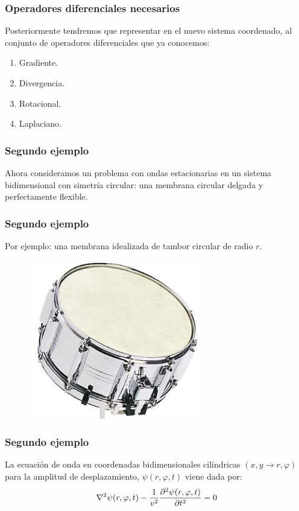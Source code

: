 \documentclass[12pt]{beamer}
\begin{document}
\begin{frame}
\frametitle{Operadores diferenciales necesarios}
Posteriormente tendremos que representar en el nuevo sistema coordenado, al conjunto de operadores diferenciales que ya conocemos:
\pause
{}
\begin{enumerate}[<+->]
\item Gradiente.
\item Divergencia.
\item Rotacional.
\item Laplaciano.
\end{enumerate}
\end{frame}
\begin{frame}
\frametitle{Segundo ejemplo}
Ahora consideramos un problema con ondas estacionarias en un sistema bidimensional con simetría circular: \pause una membrana circular delgada y perfectamente flexible.
\end{frame}
\begin{frame}
\frametitle{Segundo ejemplo}
Por ejemplo: una membrana idealizada de tambor circular de radio $r$.
\begin{figure}[H]
  \centering
  \includegraphics[scale=0.75]{Imagenes/Tambor.png}
\end{figure}
\end{frame}
\begin{frame}
\frametitle{Segundo ejemplo}
La ecuación de onda en coordenadas bidimensionales cilíndricas $(x , y \rightarrow r, \varphi)$ para la amplitud de desplazamiento, $\psi (r, \varphi, t)$ viene dada por:
\pause
\begin{align*}
\laplacian \psi (r, \varphi, t) - \dfrac{1}{v^{2}} \pdv[2]{\psi (r, \varphi, t)}{t} = 0
\end{align*}
\end{frame}
\end{document}

